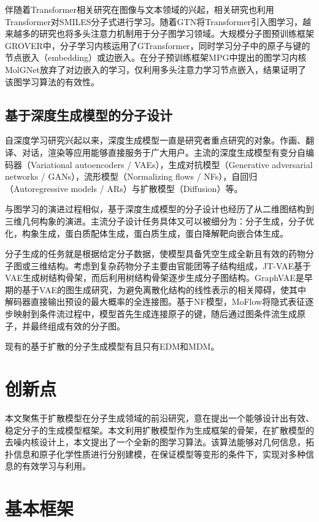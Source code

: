 伴随着Transformer\cite{transformer_vaswani_17}相关研究在图像与文本领域的兴起，相关研究\cite{smilestrans_honda_19,smilesbert_wang_19,chemberta_chithrananda_20}也利用Transformer对SMILES分子式进行学习。随着GTN\cite{gtn_yun_19}将Transformer引入图学习，越来越多的研究也将多头注意力机制用于分子图学习领域。大规模分子图预训练框架GROVER\cite{grover_rong_20}中，分子学习内核运用了GTransformer，同时学习分子中的原子与键的节点嵌入（embedding）或边嵌入。在分子预训练框架MPG\cite{mpg_li_21}中提出的图学习内核MolGNet放弃了对边嵌入的学习，仅利用多头注意力学习节点嵌入，结果证明了该图学习算法的有效性。

\subsection{基于深度生成模型的分子设计}
自深度学习研究兴起以来，深度生成模型一直是研究者重点研究的对象。作画、翻译、对话，渲染等应用能够直接服务于广大用户。主流的深度生成模型有变分自编码器（Variational autoencoders / VAEs）\cite{vae_kingma_13}，生成对抗模型（Generative adversarial networks / GANs）\cite{gan_goodfellow_14}，流形模型（Normalizing flows / NFs）\cite{nice_dinh_15,density_dinh_17}，自回归（Autoregressive models / ARs）\cite{ar_oord_16}与扩散模型（Diffusion）\cite{deepunsupervised_dickstein_15,generative_song_19}等。

与图学习的演进过程相似，基于深度生成模型的分子设计也经历了从二维图结构到三维几何构象的演进。主流分子设计任务具体又可以被细分为：分子生成，分子优化，构象生成，蛋白质配体生成，蛋白质生成，蛋白降解靶向嵌合体生成。

分子生成的任务就是根据给定分子数据，使模型具备凭空生成全新且有效的药物分子图或三维结构。考虑到复杂药物分子主要由官能团等子结构组成，JT-VAE\cite{jtvae_jin_18}基于VAE生成树结构骨架，而后利用树结构骨架逐步生成分子图结构。GraphVAE\cite{graphvae_simonovsky_18}是早期的基于VAE的图生成研究，为避免离散化结构的线性表示的相关障碍，使其中解码器直接输出预设的最大概率的全连接图。基于NF模型，MoFlow\cite{moflow_zang_20}将隐式表征逐步映射到条件流过程中，模型首先生成连接原子的键，随后通过图条件流生成原子，并最终组成有效的分子图。

现有的基于扩散的分子生成模型有且只有EDM\cite{edm_hoogeboom_22}和MDM\cite{mdm_huang_22}。
 
\section{创新点}
本文聚焦于扩散模型在分子生成领域的前沿研究，意在提出一个能够设计出有效、稳定分子的生成模型框架。本文利用扩散模型作为生成框架的骨架，在扩散模型的去噪内核设计上，本文提出了一个全新的图学习算法。该算法能够对几何信息，拓扑信息和原子化学性质进行分别建模，在保证模型等变形的条件下，实现对多种信息的有效学习与利用。

\section{基本框架}